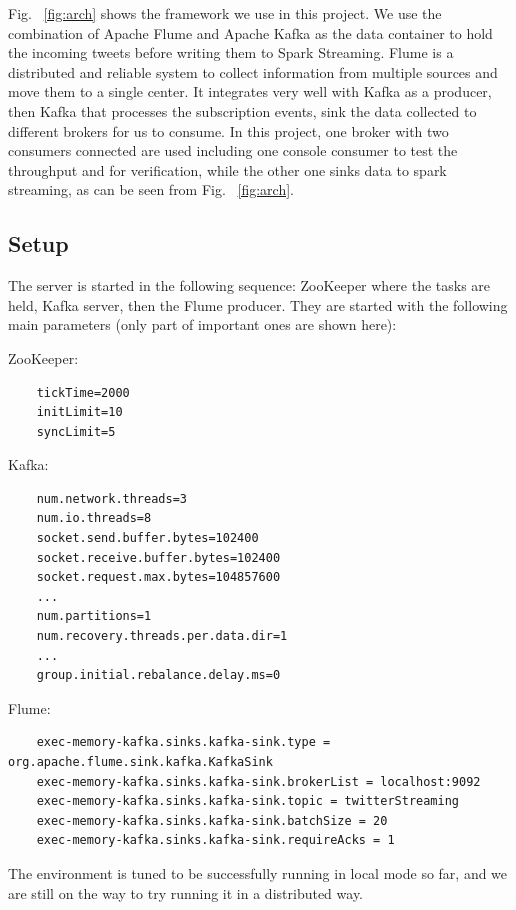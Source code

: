 \documentclass[manuscript, review, screen]{acmart}
\begin{document}
Fig. ~\ref{fig:arch} shows the framework we use in this project. We use the combination of Apache Flume and Apache Kafka as the data container to hold the incoming tweets before writing them to Spark Streaming. Flume is a distributed and reliable system to collect information from multiple sources and move them to a single center. It integrates very well with Kafka as a producer, then Kafka that processes the subscription events, sink the data collected to different brokers for us to consume. In this project, one broker with two consumers connected are used including one console consumer to test the throughput and for verification, while the other one sinks data to spark streaming, as can be seen from Fig. ~\ref{fig:arch}.

\subsection{Setup}
The server is started in the following sequence: ZooKeeper where the tasks are held, Kafka server, then the Flume producer. They are started with the following main parameters (only part of important ones are shown here):

ZooKeeper:
\begin{verbatim}
    tickTime=2000
    initLimit=10
    syncLimit=5
\end{verbatim}

Kafka:
\begin{verbatim}
    num.network.threads=3
    num.io.threads=8
    socket.send.buffer.bytes=102400
    socket.receive.buffer.bytes=102400
    socket.request.max.bytes=104857600
    ...
    num.partitions=1
    num.recovery.threads.per.data.dir=1
    ...
    group.initial.rebalance.delay.ms=0
\end{verbatim}

Flume:
\begin{verbatim}
    exec-memory-kafka.sinks.kafka-sink.type = org.apache.flume.sink.kafka.KafkaSink
    exec-memory-kafka.sinks.kafka-sink.brokerList = localhost:9092
    exec-memory-kafka.sinks.kafka-sink.topic = twitterStreaming
    exec-memory-kafka.sinks.kafka-sink.batchSize = 20
    exec-memory-kafka.sinks.kafka-sink.requireAcks = 1
\end{verbatim}

The environment is tuned to be successfully running in local mode so far, and we are still on the way to try running it in a distributed way.
\end{document}
